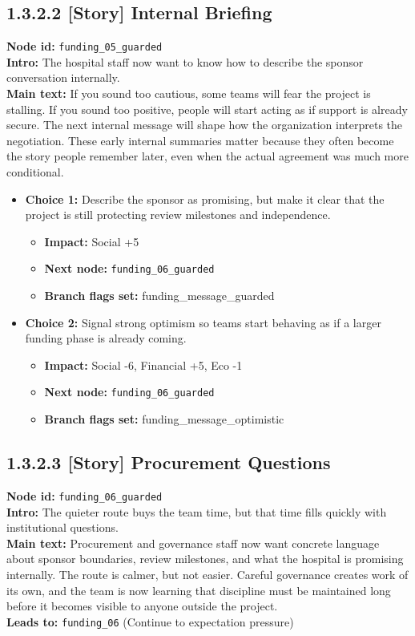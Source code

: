 \documentclass[11pt]{article}
\begin{document}
\subsection*{1.3.2.2 [Story] Internal Briefing}
\textbf{Node id:} \texttt{funding\_05\_guarded}\\
\textbf{Intro:} The hospital staff now want to know how to describe the sponsor conversation internally.\\
\textbf{Main text:} If you sound too cautious, some teams will fear the project is stalling. If you sound too positive, people will start acting as if support is already secure. The next internal message will shape how the organization interprets the negotiation. These early internal summaries matter because they often become the story people remember later, even when the actual agreement was much more conditional.\\
\begin{itemize}
\item \textbf{Choice 1:} Describe the sponsor as promising, but make it clear that the project is still protecting review milestones and independence.
\begin{itemize}
\item \textbf{Impact:} Social +5
\item \textbf{Next node:} \texttt{funding\_06\_guarded}
\item \textbf{Branch flags set:} funding\_message\_guarded
\end{itemize}
\item \textbf{Choice 2:} Signal strong optimism so teams start behaving as if a larger funding phase is already coming.
\begin{itemize}
\item \textbf{Impact:} Social -6, Financial +5, Eco -1
\item \textbf{Next node:} \texttt{funding\_06\_guarded}
\item \textbf{Branch flags set:} funding\_message\_optimistic
\end{itemize}
\end{itemize}
\subsection*{1.3.2.3 [Story] Procurement Questions}
\textbf{Node id:} \texttt{funding\_06\_guarded}\\
\textbf{Intro:} The quieter route buys the team time, but that time fills quickly with institutional questions.\\
\textbf{Main text:} Procurement and governance staff now want concrete language about sponsor boundaries, review milestones, and what the hospital is promising internally. The route is calmer, but not easier. Careful governance creates work of its own, and the team is now learning that discipline must be maintained long before it becomes visible to anyone outside the project.\\
\textbf{Leads to:} \texttt{funding\_06} (Continue to expectation pressure)\\
\end{document}
